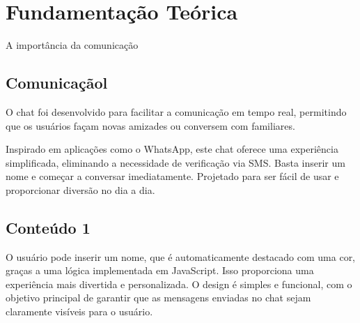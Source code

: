 \chapter{Fundamentação Teórica}
\label{ch:identificador}
	\begin{resumocapitulo}
	 A importância da comunicação 
	\end{resumocapitulo}

	\section{Comunicaçãol}
	O chat foi desenvolvido para facilitar a comunicação em tempo real, permitindo que os usuários façam novas amizades ou conversem com familiares.

Inspirado em aplicações como o WhatsApp, este chat oferece uma experiência simplificada, eliminando a necessidade de verificação via SMS. Basta inserir um nome e começar a conversar imediatamente. Projetado para ser fácil de usar e proporcionar diversão no dia a dia.

	\section{Conteúdo 1}
	\label{sec:identificao}
 O usuário pode inserir um nome, que é automaticamente destacado com uma cor, graças a uma lógica implementada em JavaScript. Isso proporciona uma experiência mais divertida e personalizada. O design é simples e funcional, com o objetivo principal de garantir que as mensagens enviadas no chat sejam claramente visíveis para o usuário.
     